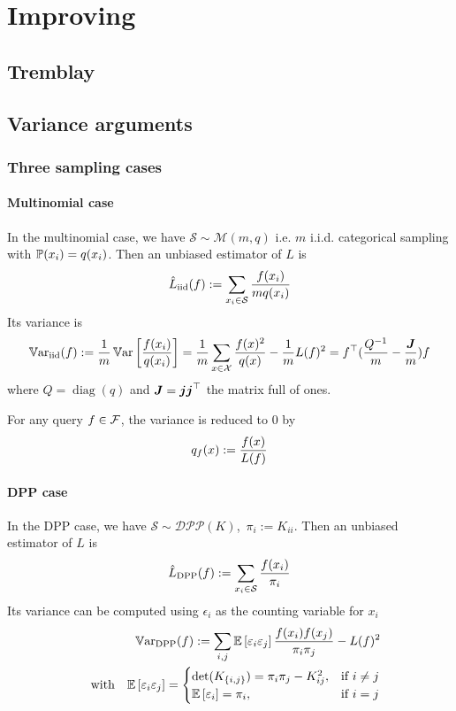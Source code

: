 \chapter{Improving}
\section{Tremblay}


\section{Variance arguments}
\subsection{Three sampling cases}
\subsubsection{Multinomial case}


In the multinomial case, we have $\mathcal S \sim \mathcal M(m, q)$ i.e. $m$ i.i.d. categorical sampling with $\mathbb{P}(x_i) = q(x_i)$.
Then an unbiased estimator of $L$ is
\begin{equation*}
	\hat L_{\textrm{iid}}(f) := \sum_{x_i\in \mathcal S} \frac{f(x_i)}{m q(x_i)}
\end{equation*}
Its variance is
\begin{equation}
	\operatorname{\mathbb V ar}_{\textrm{iid}}(f) :=\frac{1}{m} \operatorname{\mathbb V ar}\left[\frac {f(x_i)} {q(x_i)}\right] 
	=\frac{1}{m} \sum_{x \in \mathcal{X}} \frac{f(x)^{2}}{q(x)} -\frac{1}{m} L(f)^{2} = f^\top(\frac{Q^{-1}} m - \frac{\boldsymbol{J}} m)f
\end{equation}
where $Q = \operatorname{diag}(q)$ and $\boldsymbol{J} = \boldsymbol{j} \boldsymbol{j} ^\top$ the matrix full of ones. 

For any query $f \in \mathcal{F}$, the variance is reduced to 0 by
$$
q_{f}(x):=\frac{ f(x)}{L(f)}
$$


\subsubsection{DPP case}
In the DPP case, we have $ \mathcal S \sim \mathcal{DPP}(K)$, \,$\pi_i := K_{ii}$. Then an unbiased estimator of $L$ is
\begin{equation*}
	\hat L_{\textrm{DPP}}(f) := \sum_{x_i\in \mathcal S} \frac{f(x_i)}{\pi_i}
\end{equation*}
Its variance can be computed using $\epsilon_i$ as the counting variable for $x_i$
\begin{align*}
	\operatorname{\mathbb V ar}_{\textrm{DPP}}(f)
:=\sum_{i, j}\mathbb{E}\left[\varepsilon_{i} \varepsilon_{j}\right] \frac{f(x_{i}) f(x_{j})} {\pi_{i} \pi_{j}}  - L(f)^{2}\\
\quad \text{with} \quad
\mathbb{E}\left[\varepsilon_{i} \varepsilon_{j}\right]=
\begin{cases}
	\det(K_{\{i, j\}})=\pi_{i} \pi_{j}-K_{ij}^{2}, & \text{if } i \neq j \\
	\mathbb{E}\left[\varepsilon_{i}\right]=\pi_{i},&\text{if } i = j
\end{cases}
\end{align*}



